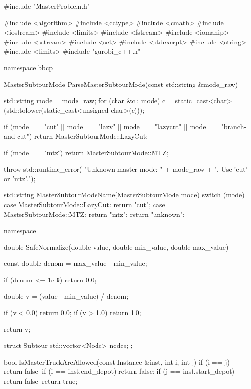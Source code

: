 #include "MasterProblem.h"

#include <algorithm>
#include <cctype>
#include <cmath>
#include <iostream>
#include <limits>
#include <fstream>
#include <iomanip>
#include <sstream>
#include <set>
#include <stdexcept>
#include <string>
#include <limits>
#include "gurobi_c++.h"

namespace bbcp
{

    MasterSubtourMode ParseMasterSubtourMode(const std::string &mode_raw)
    {
        std::string mode = mode_raw;
        for (char &c : mode)
        {
            c = static_cast<char>(std::tolower(static_cast<unsigned char>(c)));
        }

        if (mode == "cut" || mode == "lazy" || mode == "lazycut" || mode == "branch-and-cut")
        {
            return MasterSubtourMode::LazyCut;
        }

        if (mode == "mtz")
        {
            return MasterSubtourMode::MTZ;
        }

        throw std::runtime_error(
            "Unknown master mode: " + mode_raw + ". Use 'cut' or 'mtz'.");
    }

    std::string MasterSubtourModeName(MasterSubtourMode mode)
    {
        switch (mode)
        {
        case MasterSubtourMode::LazyCut:
            return "cut";
        case MasterSubtourMode::MTZ:
            return "mtz";
        }
        return "unknown";
    }

    namespace
    {

        double SafeNormalize(double value, double min_value, double max_value)
        {
            const double denom = max_value - min_value;

            if (denom <= 1e-9)
            {
                return 0.0;
            }

            double v = (value - min_value) / denom;

            if (v < 0.0)
                return 0.0;
            if (v > 1.0)
                return 1.0;

            return v;
        }
        struct Subtour
        {
            std::vector<Node> nodes;
        };

        bool IsMasterTruckArcAllowed(const Instance &inst, int i, int j)
        {
            if (i == j)
                return false;
            if (i == inst.end_depot)
                return false;
            if (j == inst.start_depot)
                return false;
            return true;
        }

}}
